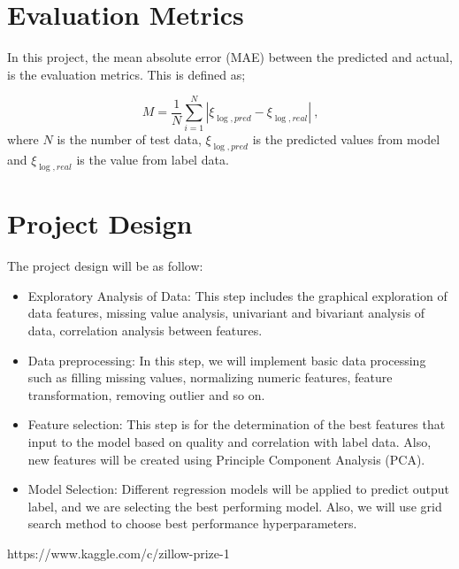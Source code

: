 \documentclass[12pt]{article}
\begin{document}
\section{Evaluation Metrics}\label{sec:metric}
In this project, the mean absolute error (MAE) between the predicted and actual, is the evaluation metrics. This is defined as;

\begin{equation}
M=\frac{1}{N}\sum_{i=1}^{N}\left|\xi_{\log,pred}-\xi_{\log,real}\right|~\text{,}
\label{eq:define-evaluation-metric}
\end{equation}
where $N$ is the number of test data, $\xi_{\log,pred}$ is the predicted values from model and $\xi_{\log,real}$ is the value from label data. 


\section{Project Design}\label{sec:design}
The project design will be as follow:

\begin{itemize}
    \item Exploratory Analysis of Data: This step includes the graphical exploration of data features, missing value analysis, univariant and bivariant analysis of data, correlation analysis between features.
    \end{itemize}

\begin{itemize}
    \item Data preprocessing: In this step, we will implement basic data processing such as filling missing values, normalizing numeric features, feature transformation, removing outlier and so on.
\end{itemize}


\begin{itemize}
    \item Feature selection: This step is for the determination of the best features that input to the model based on quality and correlation with label data. Also, new features will be created using Principle Component Analysis (PCA).
\end{itemize}

\begin{itemize}
    \item Model Selection: Different regression models will be applied to predict output label, and we are selecting the best performing model. Also, we will use grid search method to choose best performance hyperparameters. 
\end{itemize}


\begin{thebibliography}{1}

  https://www.kaggle.com/c/zillow-prize-1



\end{thebibliography} 
\end{document}
